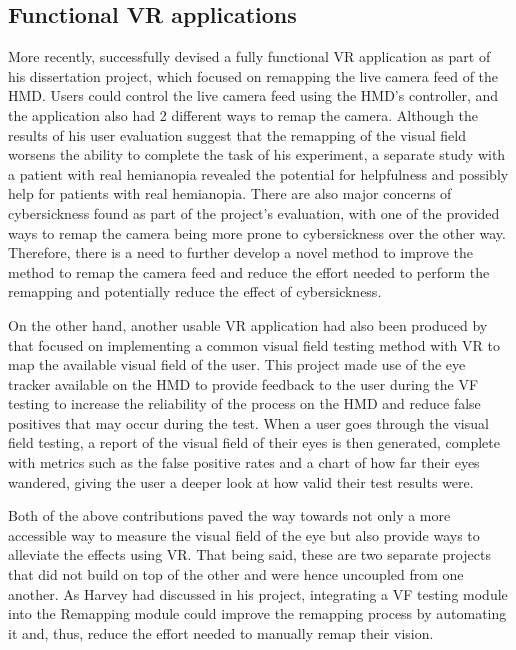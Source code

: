\documentclass{l4proj}
\begin{document}
\subsection{Functional VR applications}
More recently, \cite{Russell2023} successfully devised a fully functional VR application as part of his dissertation project, which focused on remapping the live camera feed of the HMD. Users could control the live camera feed using the HMD's controller, and the application also had 2 different ways to remap the camera. Although the results of his user evaluation suggest that the remapping of the visual field worsens the ability to complete the task of his experiment, a separate study with a patient with real hemianopia revealed the potential for helpfulness and possibly help for patients with real hemianopia. There are also major concerns of cybersickness found as part of the project's evaluation, with one of the provided ways to remap the camera being more prone to cybersickness over the other way. Therefore, there is a need to further develop a novel method to improve the method to remap the camera feed and reduce the effort needed to perform the remapping and potentially reduce the effect of cybersickness.

On the other hand, another usable VR application had also been produced by \cite{Macintosh2024} that focused on implementing a common visual field testing method with VR to map the available visual field of the user. This project made use of the eye tracker available on the HMD to provide feedback to the user during the VF testing to increase the reliability of the process on the HMD and reduce false positives that may occur during the test. When a user goes through the visual field testing, a report of the visual field of their eyes is then generated, complete with metrics such as the false positive rates and a chart of how far their eyes wandered, giving the user a deeper look at how valid their test results were. 

Both of the above contributions paved the way towards not only a more accessible way to measure the visual field of the eye but also provide ways to alleviate the effects using VR. That being said, these are two separate projects that did not build on top of the other and were hence uncoupled from one another. As Harvey had discussed in his project, integrating a VF testing module into the Remapping module could improve the remapping process by automating it and, thus, reduce the effort needed to manually remap their vision.
\end{document}
